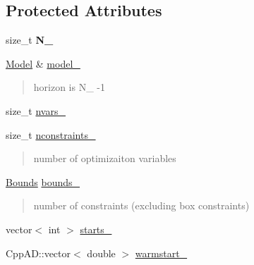 \subsection*{Protected Attributes}
\begin{DoxyCompactItemize}
\item 
\mbox{\label{classMPC_a2b810b20d87323cce8285d14230c917c}} 
size\+\_\+t {\bfseries N\+\_\+}
\item 
\mbox{\label{classMPC_abbf9a3b26a6cbc6cad87cac1c8f2aaaf}} 
\mbox{\hyperlink{classModel}{Model}} \& \mbox{\hyperlink{classMPC_abbf9a3b26a6cbc6cad87cac1c8f2aaaf}{model\+\_\+}}
\begin{DoxyCompactList}\small\item\em \begin{quote}
horizon is N\+\_\+ -\/1\end{quote}
\end{DoxyCompactList}\item 
size\+\_\+t \mbox{\hyperlink{classMPC_a9a9db53c26d46e7579d02a5d08c0358c}{nvars\+\_\+}}
\item 
\mbox{\label{classMPC_ac89334cea51103f0a4a20268b7d748ef}} 
size\+\_\+t \mbox{\hyperlink{classMPC_ac89334cea51103f0a4a20268b7d748ef}{nconstraints\+\_\+}}
\begin{DoxyCompactList}\small\item\em \begin{quote}
number of optimizaiton variables\end{quote}
\end{DoxyCompactList}\item 
\mbox{\label{classMPC_a821e5a57b25e8c83aaae02d44dab3ea8}} 
\mbox{\hyperlink{structBounds}{Bounds}} \mbox{\hyperlink{classMPC_a821e5a57b25e8c83aaae02d44dab3ea8}{bounds\+\_\+}}
\begin{DoxyCompactList}\small\item\em \begin{quote}
number of constraints (excluding box constraints)\end{quote}
\end{DoxyCompactList}\item 
vector$<$ int $>$ \mbox{\hyperlink{classMPC_af52144a70629c4809d28790fd7c0fdf3}{starts\+\_\+}}
\item 
Cpp\+A\+D\+::vector$<$ double $>$ \mbox{\hyperlink{classMPC_a303dcbda2e7d051f5f8a34e01bc414bc}{warmstart\+\_\+}}
\end{DoxyCompactItemize}


